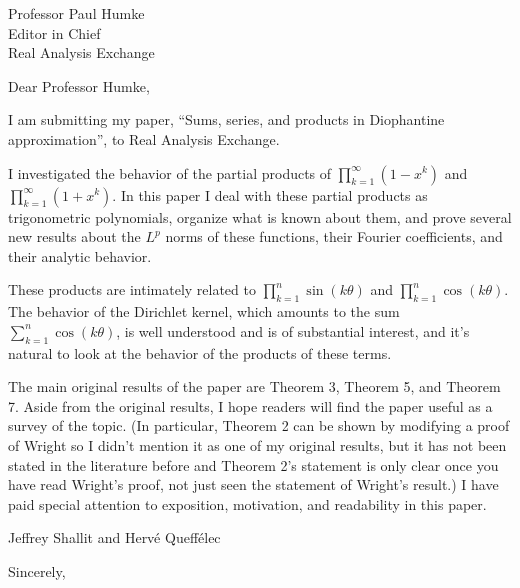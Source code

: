 \documentclass{letter}
\begin{document}
\begin{letter}{Professor Paul Humke\\
Editor in Chief\\
Real Analysis Exchange}
\opening{Dear Professor Humke,}

I am submitting my paper, ``Sums, series, and products in Diophantine approximation'', to Real Analysis Exchange. 

I investigated
the behavior of the partial products of $\prod_{k=1}^\infty (1-x^k)$ and $\prod_{k=1}^\infty (1+x^k)$.
In this paper I deal with these partial products as trigonometric polynomials, organize what is known about them, and prove several new results about the $L^p$ norms of these functions,
their Fourier coefficients, and their analytic behavior.

These products are intimately related to $\prod_{k=1}^n \sin(k\theta)$ and $\prod_{k=1}^n \cos(k\theta)$. The behavior of the Dirichlet kernel, which amounts to the sum $\sum_{k=1}^n \cos(k\theta)$, is well understood and is of substantial interest, and it's natural to look at the behavior of the products of these terms.

The main original results of the paper are Theorem 3, Theorem 5, and Theorem 7. Aside from the original results, I hope readers will find the paper useful as a survey of the topic. (In particular, Theorem 2 can be shown by modifying a proof of Wright so I didn't mention it as one of my original results, but
it has not been stated in the literature before and Theorem 2's statement is only clear once you have read Wright's proof, not just seen the statement of Wright's result.) I have paid
special attention to exposition, motivation, and readability in this paper.

Jeffrey Shallit and Hervé Queffélec

\closing{Sincerely,}

\end{letter}
\end{document}
